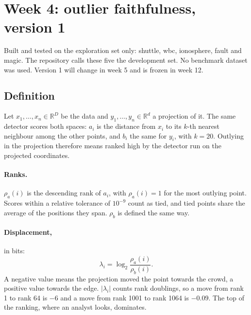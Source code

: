 %

\section*{Week 4: outlier faithfulness, version 1}

Built and tested on the exploration set only: shuttle, wbc, ionosphere,
fault and magic. The repository calls these five the development set. No
benchmark dataset was used. Version 1 will change in week 5 and is frozen
in week 12.

\subsection*{Definition}

Let $x_1, \dots, x_n \in \mathbb{R}^D$ be the data and
$y_1, \dots, y_n \in \mathbb{R}^d$ a projection of it. The same detector
scores both spaces: $a_i$ is the distance from $x_i$ to its $k$-th nearest
neighbour among the other points, and $b_i$ the same for $y_i$, with
$k = 20$. Outlying in the projection therefore means ranked high by the
detector run on the projected coordinates.

\paragraph{Ranks.} $\rho_a(i)$ is the descending rank of $a_i$, with
$\rho_a(i) = 1$ for the most outlying point. Scores within a relative
tolerance of $10^{-9}$ count as tied, and tied points share the average of
the positions they span. $\rho_b$ is defined the same way.

\paragraph{Displacement,} in bits:
\begin{equation*}
  \lambda_i = \log_2 \frac{\rho_a(i)}{\rho_b(i)} .
\end{equation*}
A negative value means the projection moved the point towards the crowd, a
positive value towards the edge. $|\lambda_i|$ counts rank doublings, so a
move from rank 1 to rank 64 is $-6$ and a move from rank 1001 to rank 1064
is $-0.09$. The top of the ranking, where an analyst looks, dominates.

